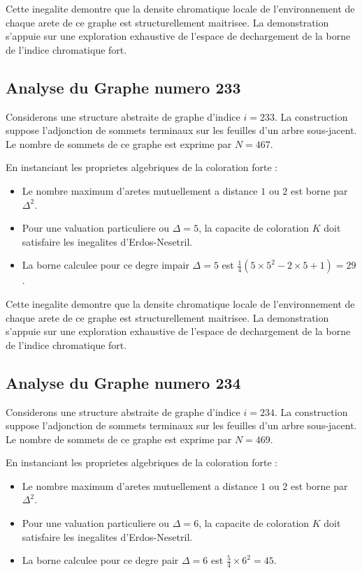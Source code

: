 \documentclass[11pt,a4paper]{article}
\begin{document}
Cette inegalite demontre que la densite chromatique locale de l'environnement de chaque arete de ce graphe est structurellement maitrisee. La demonstration s'appuie sur une exploration exhaustive de l'espace de dechargement de la borne de l'indice chromatique fort.

\subsection{Analyse du Graphe numero 233}
Considerons une structure abstraite de graphe d'indice $i = 233$. La construction suppose l'adjonction de sommets terminaux sur les feuilles d'un arbre sous-jacent. Le nombre de sommets de ce graphe est exprime par $N = 467$.

En instanciant les proprietes algebriques de la coloration forte :
\begin{itemize}
\item Le nombre maximum d'aretes mutuellement a distance $1$ ou $2$ est borne par $\Delta^2$.
\item Pour une valuation particuliere ou $\Delta = 5$, la capacite de coloration $K$ doit satisfaire les inegalites d'Erdos-Nesetril.
\item La borne calculee pour ce degre impair $\Delta = 5$ est $\frac{1}{4}(5 \times 5^2 - 2 \times 5 + 1) = 29$.
\end{itemize}

Cette inegalite demontre que la densite chromatique locale de l'environnement de chaque arete de ce graphe est structurellement maitrisee. La demonstration s'appuie sur une exploration exhaustive de l'espace de dechargement de la borne de l'indice chromatique fort.

\subsection{Analyse du Graphe numero 234}
Considerons une structure abstraite de graphe d'indice $i = 234$. La construction suppose l'adjonction de sommets terminaux sur les feuilles d'un arbre sous-jacent. Le nombre de sommets de ce graphe est exprime par $N = 469$.

En instanciant les proprietes algebriques de la coloration forte :
\begin{itemize}
\item Le nombre maximum d'aretes mutuellement a distance $1$ ou $2$ est borne par $\Delta^2$.
\item Pour une valuation particuliere ou $\Delta = 6$, la capacite de coloration $K$ doit satisfaire les inegalites d'Erdos-Nesetril.
\item La borne calculee pour ce degre pair $\Delta = 6$ est $\frac{5}{4} \times 6^2 = 45$.
\end{itemize}
\end{document}
